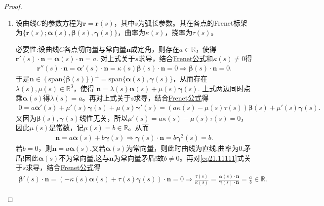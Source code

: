 \documentclass[../../main.tex]{subfiles}%
\begin{document}
\begin{proof}
\begin{enumerate}[(1)]
\item 设曲线$C$的参数方程为$\bm{r}=\bm{r}(s)$，其中$s$为弧长参数。其在各点的Frenet标架为$\{\bm{r}(s);\bm{\alpha}(s),\bm{\beta}(s),\bm{\gamma}(s)\}$，曲率为$\kappa(s)$，挠率为$\tau(s)$。

{\heiti 必要性:}设曲线$C$各点切向量与常向量$\bm{n}$成定角，则存在$a\in\mathbb{R}$，使得
$\bm{r}'(s)\cdot\bm{n}=\bm{\alpha}(s)\cdot\bm{n}=a.$
对上式关于$s$求导，结合\hyperref[theorem:微分几何-Frenet公式]{Frenet公式}和$\kappa(s)\ne0$得
\begin{align}
\bm{r}''(s)\cdot\bm{n}=\bm{\alpha}'(s)\cdot\bm{n}=\kappa(s)\bm{\beta}(s)\cdot\bm{n}=0\Longrightarrow\bm{\beta}(s)\cdot\bm{n}=0.\label{eq21.11111}
\end{align}
于是$\bm{n}\in(\mathrm{span}\{\bm{\beta}(s)\})^\perp=\mathrm{span}\{\bm{\alpha}(s),\bm{\gamma}(s)\}$，从而存在$\lambda(s),\mu(s)\in\mathbb{R}^3$，使得
$\bm{n}=\lambda(s)\bm{\alpha}(s)+\mu(s)\bm{\gamma}(s).$
上式两边同时点乘$\bm{\alpha}(s)$得$\lambda(s)=a$。再对上式关于$s$求导，结合\hyperref[theorem:微分几何-Frenet公式]{Frenet公式}得
\begin{align*}
0=a\bm{\alpha}'(s)+\mu'(s)\bm{\gamma}(s)+\mu(s)\bm{\gamma}'(s)=(a\kappa(s)-\mu(s)\tau(s))\bm{\beta}(s)+\mu'(s)\bm{\gamma}(s).
\end{align*}
又因为$\bm{\beta}(s),\bm{\gamma}(s)$线性无关，所以$\mu'(s)=a\kappa(s)-\mu(s)\tau(s)=0$，因此$\mu(s)$是常数，记$\mu(s)=b\in\mathbb{R}$。从而
\begin{align*}
\bm{n}=a\bm{\alpha}(s)+b\bm{\gamma}(s)\Longrightarrow\bm{\gamma}(s)\cdot\bm{n}=b\bm{\gamma}^2(s)=b.
\end{align*}
若$b=0$，则$\bm{n}=a\bm{\alpha}(s)$.又若$\bm{\alpha}(s)$为常向量，则此时曲线为直线,曲率为0,矛盾!因此$\bm{\alpha}(s)$不为常向量,这与$\bm{n}$为常向量矛盾!故$b\ne0$。再对\eqref{eq21.11111}式关于$s$求导，结合\hyperref[theorem:微分几何-Frenet公式]{Frenet公式}得
\begin{align*}
\bm{\beta}'(s)\cdot\bm{n}=(-\kappa(s)\bm{\alpha}(s)+\tau(s)\bm{\gamma}(s))\cdot\bm{n}=0\Longrightarrow\frac{\tau(s)}{\kappa(s)}=\frac{\bm{\alpha}(s)\cdot\bm{n}}{\bm{\gamma}(s)\cdot\bm{n}}=\frac{a}{b}\in\mathbb{R}.
\end{align*}


\end{enumerate}
\end{proof}
\end{document}
